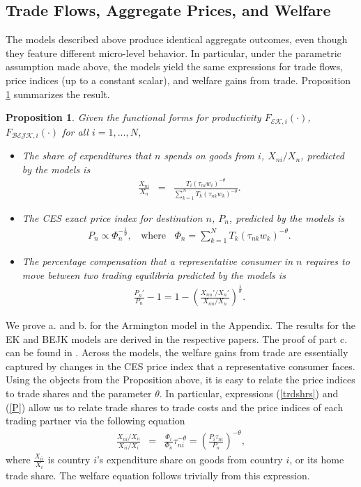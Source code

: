 \documentclass[12pt,dvips, ps2pdf]{article}
\newtheorem{prp}{Proposition}
\begin{document}
\subsection{Trade Flows, Aggregate Prices, and Welfare}
The models described above produce identical aggregate outcomes, even though they feature different micro-level behavior. In particular, under the parametric assumption made above, the models yield the same expressions for trade flows, price indices (up to a constant scalar), and welfare gains from trade. Proposition \ref{prop_agg} summarizes the result.
\begin{prp}
\label{prop_agg}
Given the functional forms for productivity $F_{\mathcal{EK},i}(\cdot)$, $F_{\mathcal{BEJK},i}(\cdot)$ for all $i=1,...,N$,
\begin{itemize}
\item[a.] The share of expenditures that $n$ spends on goods from $i$, $X_{ni}/X_n$, predicted by the models is
\begin{eqnarray}
\displaystyle \label{trdshrs} \frac{X_{ni}}{X_n}&=&\frac{T_i(\tau_{ni}w_i)^{-\theta}}{\sum_{k=1}^NT_k(\tau_{nk}w_k)^{-\theta}}.
\end{eqnarray}
\item[b.] The CES exact price index for destination $n$, $P_n$, predicted by the models is
\begin{eqnarray}
\label{P}
P_n\propto \Phi_n^{-\frac{1}{\theta}}, \ \ \ \ \mbox{where} \ \ \ \ \Phi_n = \sum_{k=1}^NT_k(\tau_{nk}w_k)^{-\theta}.
\end{eqnarray}
\item[c.] The percentage compensation that a representative consumer in $n$ requires to move between two trading equilibria predicted by the models is
\begin{eqnarray}
\label{welfare}
\frac{P_n'}{P_n}-1=1-\left(\frac{X_{nn}'/X_{n}'}{X_{nn}/X_n}\right)^\frac{1}{\theta}.
\end{eqnarray}
\end{itemize}
\end{prp}
We prove a. and b. for the Armington model in the Appendix. The results for the EK and BEJK models are derived in the respective papers. The proof of part c. can be found in \citet{acr09}. Across the models, the welfare gains from trade are essentially captured by changes in the CES price index that a representative consumer faces. Using the objects from the Proposition above, it is easy to relate the price indices to trade shares and the parameter $\theta$. In particular, expressions (\ref{trdshrs}) and (\ref{P}) allow us to relate trade shares to trade costs and the price indices of each trading partner via the following equation
\begin{eqnarray}
\displaystyle \label{main_eq} \frac{X_{ni}/X_n}{X_{ii}/X_i}&=& \frac{\Phi_i}{\Phi_n}\tau_{ni}^{-\theta} = \left(\frac{P_i\tau_{ni}}{P_n}\right)^{-\theta},
\end{eqnarray}
\noindent where $\frac{X_{ii}}{X_i}$ is country $i$'s expenditure share on goods from country $i$, or its home trade share. The welfare equation follows trivially from this expression.
\end{document}
